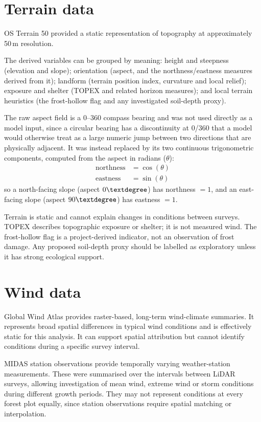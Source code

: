\documentclass[11pt,a4paper]{report}
\begin{document}
\section{Terrain data}
OS Terrain 50 provided a static representation of topography at approximately 50\,m resolution.

The derived variables can be grouped by meaning: height and steepness (elevation and slope); orientation (aspect, and the northness/eastness measures derived from it); landform (terrain position index, curvature and local relief); exposure and shelter (TOPEX and related horizon measures); and local terrain heuristics (the frost-hollow flag and any investigated soil-depth proxy).

The raw aspect field is a 0--360\textdegree{} compass bearing and was not used directly as a model input, since a circular bearing has a discontinuity at 0\textdegree{}/360\textdegree{} that a model would otherwise treat as a large numeric jump between two directions that are physically adjacent.
It was instead replaced by its two continuous trigonometric components, computed from the aspect in radians ($\theta$):
\begin{align*}
\text{northness} &= \cos(\theta) \\
\text{eastness} &= \sin(\theta)
\end{align*}
so a north-facing slope (aspect $0\textdegree$) has northness $=1$, and an east-facing slope (aspect $90\textdegree$) has eastness $=1$.

Terrain is static and cannot explain changes in conditions between surveys.
TOPEX describes topographic exposure or shelter; it is not measured wind.
The frost-hollow flag is a project-derived indicator, not an observation of frost damage.
Any proposed soil-depth proxy should be labelled as exploratory unless it has strong ecological support.

\section{Wind data}
Global Wind Atlas provides raster-based, long-term wind-climate summaries.
It represents broad spatial differences in typical wind conditions and is effectively static for this analysis.
It can support spatial attribution but cannot identify conditions during a specific survey interval.

MIDAS station observations provide temporally varying weather-station measurements.
These were summarised over the intervals between LiDAR surveys, allowing investigation of mean wind, extreme wind or storm conditions during different growth periods.
They may not represent conditions at every forest plot equally, since station observations require spatial matching or interpolation.
\end{document}
